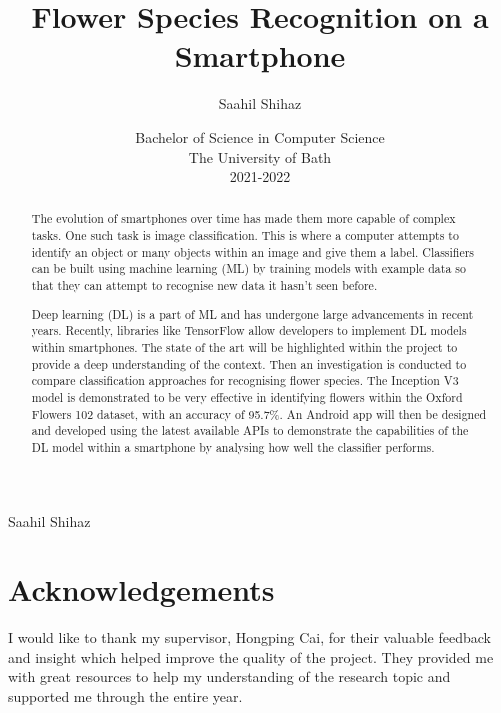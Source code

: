 \documentclass[12pt,a4paper]{report}
\title{\bf Flower Species Recognition on a Smartphone}
\author{Saahil Shihaz}
\date{Bachelor of Science in Computer Science\\
    The University of Bath\\
    2021-2022}
\begin{document}
\hypersetup{pageanchor=false}
\setcounter{page}{0}
\maketitle
\newpage
{}
\newpage
{}
{Saahil Shihaz}
\newpage
\hypersetup{pageanchor=true}
\begin{abstract}

    The evolution of smartphones over time has made them more capable of complex tasks. One such task is image 
    classification. This is where a computer attempts to identify an object or many objects within an image and give 
    them a label. Classifiers can be built using machine learning (ML) by training models with example data so that they 
    can attempt to recognise new data it hasn't seen before. 
    
    \par
    
    Deep learning (DL) is a part of ML and has undergone large advancements in
    recent years. Recently, libraries like TensorFlow allow developers to implement DL models within 
    smartphones. The state of the art will be highlighted within the project to provide a deep understanding of the 
    context. Then an investigation is conducted to compare classification approaches for recognising flower species. The
    Inception V3 model is demonstrated to be very effective in identifying flowers within the Oxford Flowers 102 
    dataset, with an accuracy of 95.7\%. An Android app will then be designed and developed using the latest available 
    APIs to demonstrate the capabilities of the DL model within a smartphone by analysing how well the classifier 
    performs. 

\end{abstract}
\clearpage
\tableofcontents
\clearpage
\listoffigures
\clearpage
\chapter*{Acknowledgements}
\thispagestyle{empty}

I would like to thank my supervisor, Hongping Cai, for their valuable feedback and insight which helped improve the 
quality of the project. They provided me with great resources to help my understanding of the research topic and
supported me through the entire year.

\par
\end{document}
